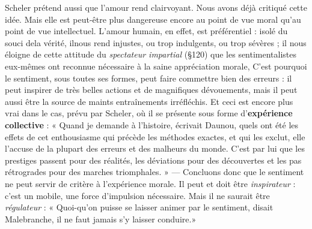 Scheler prétend aussi que l’amour rend clairvoyant. Nous avons
déjà critiqué cette idée. Mais elle est peut-être plus dangereuse encore
au point de vue moral qu’au point de vue intellectuel. L'amour
humain, en effet, est préférentiel : isolé du souci dela vérité, ilnous rend
injustes, ou trop indulgents, ou trop sévères ; il nous éloigne de cette
attitude du {\it spectateur impartial} (\S 120) que les sentimentalistes eux-mêmes
ont reconnue nécessaire à la saine appréciation morale, C’est
pourquoi le sentiment, sous toutes ses formes, peut faire commettre
bien des erreurs : il peut inspirer de très belles actions et de magnifiques
dévouements, mais il peut aussi être la source de maints entraînements
irréfléchis. Et ceci est encore plus vrai dans le cas, prévu par
Scheler, où il se présente sous forme d’{\bf expérience collective} : « Quand
je demande à l’histoire, écrivait Daunou, quels ont été les effets de cet
enthousiasme qui précède les méthodes exactes, et qui les exclut,
elle l’accuse de la plupart des erreurs et des malheurs du monde. C’est
par lui que les prestiges passent pour des réalités, les déviations pour
des découvertes et les pas rétrogrades pour des marches triomphales. »
— Concluons donc que le sentiment ne peut servir de critère à l’expérience
morale. Il peut et doit être {\it inspirateur} : c’est un mobile, une
force d’impulsion nécessaire. Mais il ne saurait être {\it régulateur} : « Quoi-qu’on
puisse se laisser animer par le sentiment, disait Malebranche,
il ne faut jamais s’y laisser conduire.»

